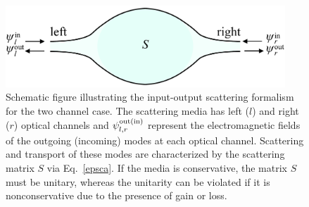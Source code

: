 \documentclass{tADP2e}
\theoremstyle{plain}
\theoremstyle{plain}
\theoremstyle{definition}
\begin{document}
{\begin{figure}
\begin{center}
\includegraphics[width=10.5cm]{./Figures/fig_2_scattering.pdf}
\end{center}
\caption{Schematic figure illustrating the input-output scattering formalism for the two channel case. The scattering media has left ($l$) and right ($r$) optical channels and $\psi_{l,r}^{\rm out (in)}$ represent the electromagnetic fields of the outgoing (incoming) modes at each optical channel. Scattering and transport of these modes are characterized by the scattering matrix $S$ via Eq.~\eqref{epsca}. If the media is conservative, the matrix $S$ must be unitary, whereas the unitarity can be violated if it is nonconservative due to the presence of gain or loss.}
\label{fig:2scattering}
\end{figure}

}
\end{document}
